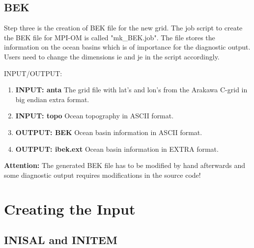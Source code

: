 \subsection{BEK}

Step three is the creation of BEK file for the new grid. 
The job script to create the BEK file for MPI-OM 
is called "mk\_BEK.job".
The file stores the information on the ocean basins which is of importance for 
the diagnostic output. Users need to change the dimensions ie and je 
in the script accordingly. 

INPUT/OUTPUT:
\begin{enumerate}

\item \textbf{INPUT: anta} \newline
The grid file with lat's  and lon's from the Arakawa C-grid
in big endian extra format.

\item \textbf{INPUT: topo} \newline
Ocean topography in ASCII format.

\item \textbf{OUTPUT: BEK} \newline
Ocean basin information in ASCII format.

\item \textbf{OUTPUT: ibek.ext} \newline
Ocean basin information in EXTRA format.

\end{enumerate}

{\bf Attention:} The generated BEK file has to be modified by hand afterwards and
some diagnostic output requires modifications in the source code!


\section[Creating the Input]
{\Large{\bf Creating the Input}\label{ch:setup:input}}

\subsection{INISAL and INITEM}

